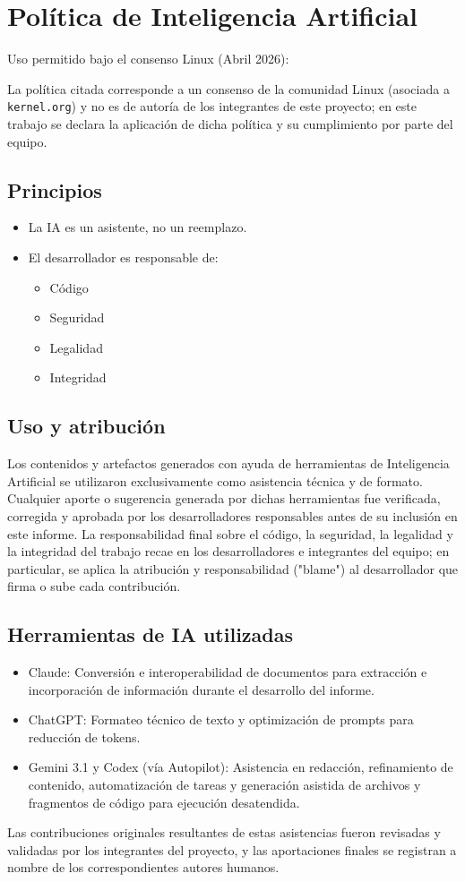 \section{Política de Inteligencia Artificial}
\label{sec:ia}

Uso permitido bajo el consenso Linux (Abril 2026):

La política citada corresponde a un consenso de la comunidad Linux (asociada a \texttt{kernel.org}) y no es de autoría de los integrantes de este proyecto; en este trabajo se declara la aplicación de dicha política y su cumplimiento por parte del equipo.

\subsection*{Principios}
\begin{itemize}
  \item La IA es un asistente, no un reemplazo.
  \item El desarrollador es responsable de:
  \begin{itemize}
    \item Código
    \item Seguridad
    \item Legalidad
    \item Integridad
  \end{itemize}
\end{itemize}

\subsection*{Uso y atribución}
Los contenidos y artefactos generados con ayuda de herramientas de Inteligencia Artificial se utilizaron exclusivamente como asistencia técnica y de formato. Cualquier aporte o sugerencia generada por dichas herramientas fue verificada, corregida y aprobada por los desarrolladores responsables antes de su inclusión en este informe. La responsabilidad final sobre el código, la seguridad, la legalidad y la integridad del trabajo recae en los desarrolladores e integrantes del equipo; en particular, se aplica la atribución y responsabilidad ("blame") al desarrollador que firma o sube cada contribución.

\subsection*{Herramientas de IA utilizadas}
\begin{itemize}
  \item Claude: Conversión e interoperabilidad de documentos para extracción e incorporación de información durante el desarrollo del informe.
  \item ChatGPT: Formateo técnico de texto y optimización de prompts para reducción de tokens.
  \item Gemini 3.1 y Codex (vía Autopilot): Asistencia en redacción, refinamiento de contenido, automatización de tareas y generación asistida de archivos y fragmentos de código para ejecución desatendida.
\end{itemize}

Las contribuciones originales resultantes de estas asistencias fueron revisadas y validadas por los integrantes del proyecto, y las aportaciones finales se registran a nombre de los correspondientes autores humanos.
